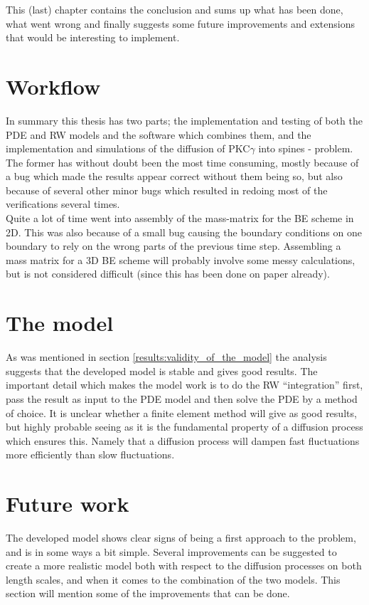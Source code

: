 This (last) chapter contains the conclusion and sums up what has been done, what went wrong and finally suggests some future improvements and extensions that would be interesting to implement.

\section{Workflow}

In summary this thesis has two parts; the implementation and testing of both the PDE and RW models and the software which combines them, and the implementation and simulations of the diffusion of PKC$\gamma$ into spines - problem. 
The former has without doubt been the most time consuming, mostly because of a bug which made the results appear correct without them being so, but also because of several other minor bugs which resulted in redoing most of the verifications several times.\\

Quite a lot of time went into assembly of the mass-matrix for the BE scheme in 2D. 
This was also because of a small bug causing the boundary conditions on one boundary to rely on the wrong parts of the previous time step. 
Assembling a mass matrix for a 3D BE scheme will probably involve some messy calculations, but is not considered difficult (since this has been done on paper already).


\section{The model}

As was mentioned in section \ref{results:validity_of_the_model} the analysis suggests that the developed model is stable and gives good results. 
The important detail which makes the model work is to do the RW ``integration'' first, pass the result as input to the PDE model and then solve the PDE by a method of choice. 
It is unclear whether a finite element method will give as good results, but highly probable seeing as it is the fundamental property of a diffusion process which ensures this. Namely that a diffusion process will dampen fast fluctuations more efficiently than slow fluctuations.

\section{Future work}
The developed model shows clear signs of being a first approach to the problem, and is in some ways a bit simple. 
Several improvements can be suggested to create a more realistic model both with respect to the diffusion processes on both length scales, and when it comes to the combination of the two models. 
This section will mention some of the improvements that can be done.

